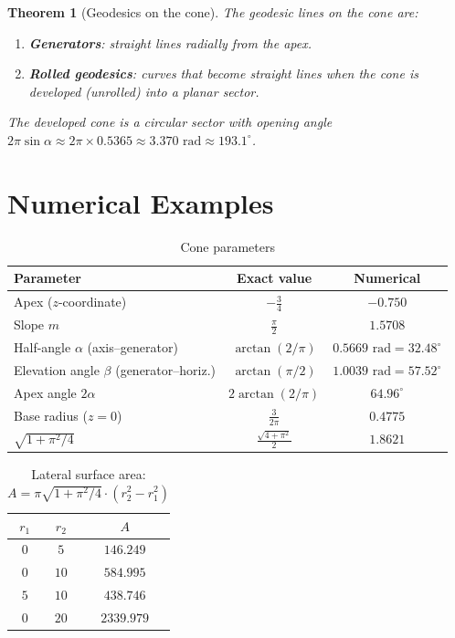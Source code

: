 \documentclass[12pt,a4paper]{article}
\theoremstyle{plain}
\newtheorem{theorem}{Theorem}[section]
\theoremstyle{definition}
\theoremstyle{remark}
\begin{document}
\begin{theorem}[Geodesics on the cone]
The geodesic lines on the cone are:
\begin{enumerate}
\item \textbf{Generators}: straight lines radially from the apex.
\item \textbf{Rolled geodesics}: curves that become straight lines when the cone
is developed (unrolled) into a planar sector.
\end{enumerate}
The developed cone is a circular sector with opening angle
$2\pi\sin\alpha \approx 2\pi\times 0.5365 \approx 3.370\text{ rad} \approx 193.1^\circ$.
\end{theorem}

\section{Numerical Examples}

\begin{table}[H]
\centering
\caption{Cone parameters}\label{tab:parameters}
\begin{tabular}{lcc}
\toprule
Parameter & Exact value & Numerical \\
\midrule
Apex ($z$-coordinate) & $-\tfrac{3}{4}$ & $-0.750$ \\
Slope $m$ & $\tfrac{\pi}{2}$ & $1.5708$ \\
Half-angle $\alpha$ (axis--generator) & $\arctan(2/\pi)$ & $0.5669\text{ rad} = 32.48^\circ$ \\
Elevation angle $\beta$ (generator--horiz.) & $\arctan(\pi/2)$ & $1.0039\text{ rad} = 57.52^\circ$ \\
Apex angle $2\alpha$ & $2\arctan(2/\pi)$ & $64.96^\circ$ \\
Base radius ($z=0$) & $\tfrac{3}{2\pi}$ & $0.4775$ \\
$\sqrt{1+\pi^2/4}$ & $\tfrac{\sqrt{4+\pi^2}}{2}$ & $1.8621$ \\
\bottomrule
\end{tabular}
\end{table}

\begin{table}[H]
\centering
\caption{Lateral surface area: $A = \pi\sqrt{1+\pi^2/4}\cdot(r_2^2-r_1^2)$}
\label{tab:surface_area}
\begin{tabular}{ccc}
\toprule
$r_1$ & $r_2$ & $A$ \\
\midrule
$0$ & $5$  & $146.249$ \\
$0$ & $10$ & $584.995$ \\
$5$ & $10$ & $438.746$ \\
$0$ & $20$ & $2339.979$ \\
\bottomrule
\end{tabular}
\end{table}
\end{document}
